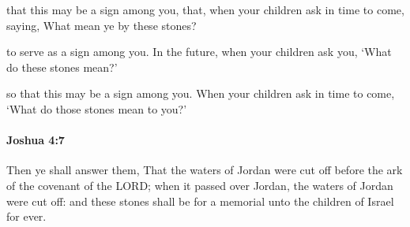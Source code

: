 			\begin{versebox}
					\item[BHS] 
					\item[ASV] that this may be a sign among you, that, when your children ask in time to come, saying, What mean ye by these stones?
					\item[NIV] to serve as a sign among you. In the future, when your children ask you, ‘What do these stones mean?’
					\item[NRSV] so that this may be a sign among you. When your children ask in time to come, ‘What do those stones mean to you?’
			\end{versebox}

		\paragraph{Joshua 4:7} %
			\label{JOSHUA-4-7}

			Then ye shall answer them, That the waters of Jordan were cut off before the ark of the covenant of the LORD; when it passed over Jordan, the waters of Jordan were cut off: and these stones shall be for a memorial unto the children of Israel for ever.

